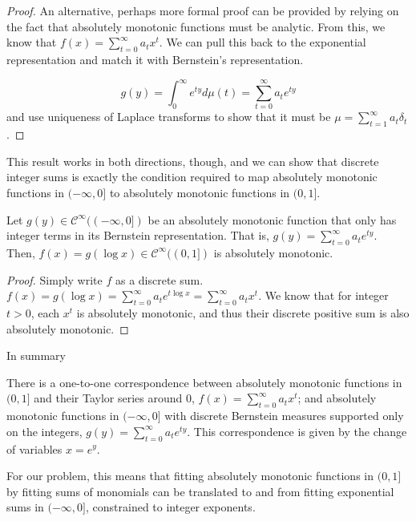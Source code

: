 \documentclass[12pt,a4paper]{article}
\newcommand{\cinfty} {\mathcal{C}^{\infty}}
\begin{document}
\begin{proof}
An alternative, perhaps more formal proof can be provided by relying on the fact that absolutely monotonic functions must be analytic. From this, we know that $f(x) = \sum_{t=0}^{\infty} a_t x^t$. We can pull this back to the exponential representation and match it with Bernstein's representation.

\begin{equation}
g(y) = \int_0^{\infty} e^{ty}d\mu(t) = \sum_{t=0}^{\infty} a_t e^{ty}
\end{equation}
\noindent and use uniqueness of Laplace transforms to show that it must be $\mu = \sum_{t=1}^{\infty} a_t \delta_t$.
\end{proof}

This result works in both directions, though, and we can show that discrete integer sums is exactly the condition required to map absolutely monotonic functions in $(-\infty,0]$ to absolutely monotonic functions in $(0,1]$.

\begin{lemma}
Let $g(y) \in \cinfty((-\infty,0])$ be an absolutely monotonic function that only has integer terms in its Bernstein representation. That is, $g(y) = \sum_{t=0}^{\infty} a_t e^{ty}$.\\

Then, $f(x) = g(\log x) \in \cinfty((0,1])$ is absolutely monotonic.
\end{lemma}

\begin{proof}
Simply write $f$ as a discrete sum. $f(x) = g(\log x) = \sum_{t=0}^{\infty} a_t e^{t \log x} = \sum_{t=0}^{\infty} a_t x^t$. We know that for integer $t > 0$, each $x^t$ is absolutely monotonic, and thus their discrete positive sum is also absolutely monotonic.
\end{proof}

In summary

\begin{theorem}
There is a one-to-one correspondence between absolutely monotonic functions in $(0,1]$ and their Taylor series around $0$, $f(x) = \sum_{t=0}^{\infty} a_t x^t$; and absolutely monotonic functions in $(-\infty,0]$ with discrete Bernstein measures supported only on the integers, $g(y) = \sum_{t=0}^{\infty} a_t e^{ty}$. This correspondence is given by the change of variables $x = e^y$.
\end{theorem}

For our problem, this means that fitting absolutely monotonic functions in $(0,1]$ by fitting sums of monomials can be translated to and from fitting exponential sums in $(-\infty,0]$, constrained to integer exponents.\\
\end{document}
